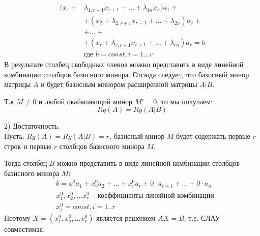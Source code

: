 \begin{answer}
  \begin{align*}
    (x_1 + &\lambda_{1,r+1} x_{r+1} + \ldots + \lambda_{1n} x_{n}) a_1 + \\
          &+ (x_2 + \lambda_{2,r+1} x_{r+1} + \ldots + \lambda_{2n}) a_2 + \\
          &+ \ldots + \\
          &+ (x_r + \lambda_{r,r+1} x_{r+1} + \ldots + \lambda_{rn}) a_r = b \\
          &\text{где } b = const, i=1 \ldots r
  \end{align*}
  В результате столбец свободных членов можно представить в виде линейной комбинации столбцов базисного минора. Отсюда следует, что базисный минор матрицы $A$ и будет базисным минором расширенной матрицы $A|B$.
  
  Т.к $M \neq 0$ и любой окаймляющий минор $M' = 0$, то мы получаем: \[
  Rg(A) = Rg(A|B)
  \] 

  2) Достаточность. \\
  Пусть: $Rg(A) = Rg(A|B) = r$, базисный минор $M$ будет содержать первые $r$ строк и первые  $r$ столбцов базисного минора $M$.
  
  Тогда столбец  $B$ можно представить в виде линейной комбинации столбцов базисного минора $M$:
  \begin{align*}
    &b = x_1^0 a_1 + x_2^0 a_2 + \ldots + x_r^0 a_r + 0 \cdot a_{r+1} + \ldots + 0 \cdot a_n \\
    &x_1^0, x_2^0, \ldots x_r^0 \text{ -- коеффициенты линейной комбинации} \\
    &x_i^0 = const, i=1..r
  \end{align*}
  Поэтому $X = \left( x_1^0, x_2^0, \ldots x_r^0 \right) $ является решением $AX=B$, т.е. СЛАУ совместимая.
\end{answer} 

